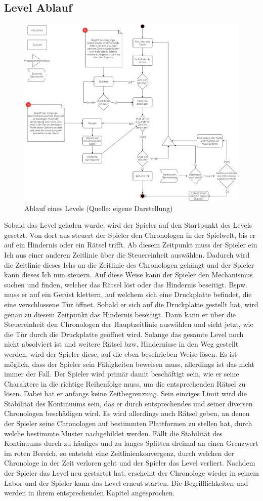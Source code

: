 \subsection{Level Ablauf}

\begin{figure}[ht]
\centering
\includegraphics[width=0.3\linewidth]{content/pictures/level_loop.jpg}
\caption{Ablauf eines Levels (Quelle: eigene Darstellung)}
\label{fig:level_loop}
\end{figure}

Sobald das Level geladen wurde, wird der Spieler auf den Startpunkt des Levels gesetzt. Von dort aus steuert der Spieler den Chronologen in der Spielwelt, bis er auf ein Hindernis oder ein Rätsel trifft. Ab diesem Zeitpunkt muss der Spieler ein Ich aus einer anderen Zeitlinie über die Steuereinheit auswählen. Dadurch wird die Zeitlinie dieses Ichs an die Zeitlinie des Chronologen gehängt und der Spieler kann dieses Ich nun steuern. Auf diese Weise kann der Spieler den Mechanismus suchen und finden, welcher das Rätsel löst oder das Hindernis beseitigt. Bspw. muss er auf ein Gerüst klettern, auf welchem sich eine Druckplatte befindet, die eine verschlossene Tür öffnet. Sobald er sich auf die Druckplatte gestellt hat, wird genau zu diesem Zeitpunkt das Hindernis beseitigt. Dann kann er über die Steuereinheit den Chronologen der Hauptzeitlinie auswählen und sieht jetzt, wie die Tür durch die Druckplatte geöffnet wird. Solange das gesamte Level noch nicht absolviert ist und weitere Rätsel bzw. Hindernisse in den Weg gestellt werden, wird der Spieler diese, auf die eben beschrieben Weise lösen. Es ist möglich, dass der Spieler sein  Fähigkeiten beweisen muss, allerdings ist das nicht immer der Fall. Der Spieler wird primär damit beschäftigt sein, wie er seine Charaktere in die richtige Reihenfolge  muss, um die entsprechenden Rätsel zu lösen. Dabei hat er anfangs keine Zeitbegrenzung. Sein einziges Limit wird die Stabilität des Kontinuums sein, das er durch entsprechendes  und  seiner diversen Chronologen beschädigen wird. Es wird allerdings auch Rätsel geben, an denen der Spieler seine Chronologen auf bestimmten Plattformen zu stellen hat, durch welche bestimmte Muster nachgebildet werden. 
Fällt die Stabilität des Kontinuums durch zu häufiges und zu langes Splitten dreimal an einen Grenzwert im roten Bereich, so entsteht eine Zeitlinienkonvergenz, durch welchen der Chronologe in der Zeit verloren geht und der Spieler das Level verliert. Nachdem der Spieler das Level neu gestartet hat, erscheint der Chronologe wieder in seinem Labor und der Spieler kann das Level erneut starten.
Die Begrifflichkeiten  und  werden in ihrem entsprechenden Kapitel angesprochen.


